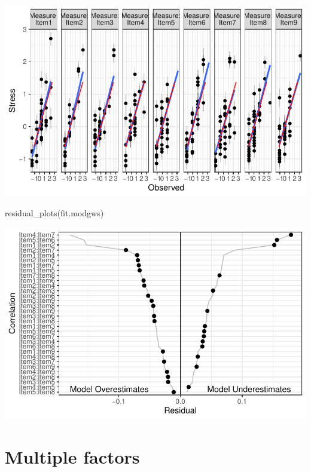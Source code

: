 \documentclass[
  letterpaper,
  DIV=11,
  numbers=noendperiod]{scrreprt}
\newenvironment{Shaded}{\begin{snugshade}}{\end{snugshade}}
\newcommand{\FunctionTok}[1]{\textcolor[rgb]{0.28,0.35,0.67}{#1}}
\newcommand{\NormalTok}[1]{\textcolor[rgb]{0.00,0.23,0.31}{#1}}
\begin{document}
\includegraphics{Spearman_files/figure-pdf/unnamed-chunk-2-2.pdf}

\begin{Shaded}
\begin{Highlighting}[]
\FunctionTok{residual\_plots}\NormalTok{(fit.modgws)}
\end{Highlighting}
\end{Shaded}

\includegraphics{Spearman_files/figure-pdf/unnamed-chunk-2-3.pdf}


\chapter{Multiple factors}\label{multiple-factors}
\end{document}
